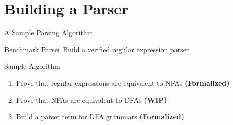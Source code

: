 \documentclass[10pt]{beamer}
\begin{document}
\section{Building a Parser}

\begin{frame}{A Sample Parsing Algorithm}
  \begin{alertblock}{Benchmark Parser}
  Build a verified regular expression parser
  \end{alertblock}
  \begin{block}{Sample Algorithm}
    \begin{enumerate}
      \item Prove that regular expressions are equivalent to NFAs \textbf{(Formalized)}
      \item Prove that NFAs are equivalent to DFAs \textbf{(WIP)}
      \item Build a parser term for DFA grammars \textbf{(Formalized)}
    \end{enumerate}
  \end{block}
\end{frame}
\end{document}
